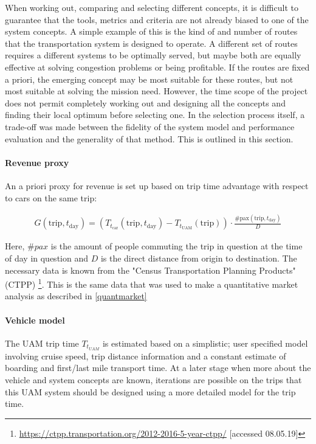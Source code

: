 When working out, comparing and selecting different concepts, it is difficult to guarantee that the tools, metrics and criteria are not already biased to one of the system concepts. A simple example of this is the kind of and number of routes that the transportation system is designed to operate. A different set of routes requires a different systems to be optimally served, but maybe both are equally effective at solving congestion problems or being profitable. If the routes are fixed a priori, the emerging concept may be most suitable for these routes, but not most suitable at solving the mission need. However, the time scope of the project does not permit completely working out and designing all the concepts and finding their local optimum before selecting one. In the selection process itself, a trade-off was made between the fidelity of the system model and performance evaluation and the generality of that method. This is outlined in this section.


\paragraph{Revenue proxy}

An a priori proxy for revenue is set up based on trip time advantage with respect to cars on the same trip:

\begin{align} \label{eq:gainmetric}
    G(\text{trip}, t_\text{day}) = \left( T_{t_\text{car}}(\text{trip}, t_\text{day}) - T_{{t}_\text{UAM}}(\text{trip}) \right) \cdot \frac{\#\text{pax}(\text{trip},t_\text{day})}{D}
\end{align}

Here, $\#pax$ is the amount of people commuting the trip in question at the time of day in question and $D$ is the direct distance from origin to destination. The necessary data is known from the "Census Transportation Planning Products" (CTPP) \footnote{\url{https://ctpp.transportation.org/2012-2016-5-year-ctpp/} [accessed 08.05.19]}. This is the same data that was used to make a quantitative market analysis as described in \autoref{quantmarket}

\paragraph{Vehicle model}

The UAM trip time $T_{{t}_{UAM}}$ is estimated based on a simplistic; user specified model involving cruise speed, trip distance information and a constant estimate of boarding and first/last mile transport time. At a later stage when more about the vehicle and system concepts are known, iterations are possible on the trips that this UAM system should be designed using a more detailed model for the trip time.


